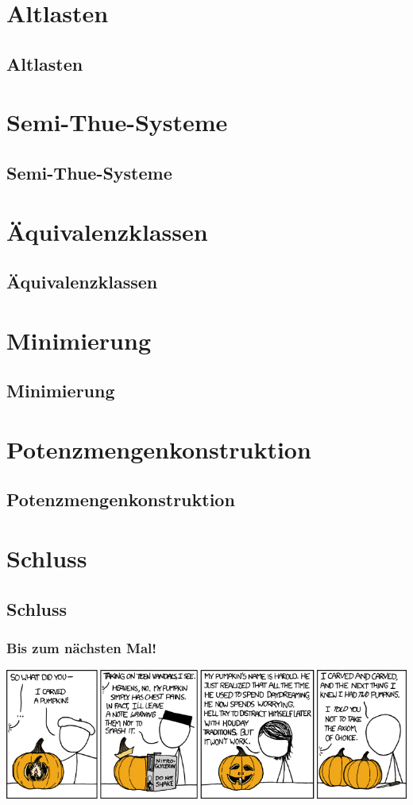 

\section{Altlasten}
\subsection{Altlasten}

\section{Semi-Thue-Systeme}
\subsection{Semi-Thue-Systeme}

\section{Äquivalenzklassen}
\subsection{Äquivalenzklassen}

\section{Minimierung}
\subsection{Minimierung}

\section{Potenzmengenkonstruktion}
\subsection{Potenzmengenkonstruktion}
	
\section{Schluss}
\subsection{Schluss}

\begin{frame}
\frametitle{Bis zum nächsten Mal!}
\vspace{-0.5cm}
\begin{center}\includegraphics[height=0.8\textheight]{images/xkcd_804.png}\end{center}
\end{frame}


